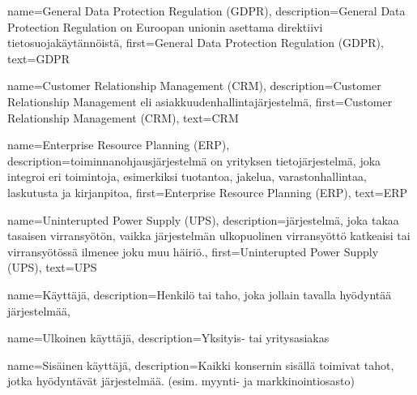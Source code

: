 %
%
%

\makeglossaries



    {
    name={General Data Protection Regulation (GDPR)},
	description={General Data Protection Regulation on Euroopan unionin asettama direktiivi tietosuojakäytännöistä},
	first={General Data Protection Regulation (GDPR)},
	text={GDPR}
    }

    {
	name={Customer Relationship Management (CRM)},
	description={Customer Relationship Management eli asiakkuudenhallintajärjestelmä},
	first={Customer Relationship Management (CRM)},
	text={CRM}
    }

    {
    name={Enterprise Resource Planning (ERP)},
    description={toiminnanohjausjärjestelmä on yrityksen tietojärjestelmä, joka integroi eri toimintoja, esimerkiksi tuotantoa, jakelua, varastonhallintaa, laskutusta ja kirjanpitoa},
    first={Enterprise Resource Planning (ERP)},
    text={ERP}
    }

    {
    name={Uninterupted Power Supply (UPS)},
    description={järjestelmä, joka takaa tasaisen virransyötön, vaikka järjestelmän ulkopuolinen virransyöttö katkeaisi tai virransyötössä ilmenee joku muu häiriö.},
    first={Uninterupted Power Supply (UPS)},
    text={UPS}
    }

    {
    name={Käyttäjä},
    description={Henkilö tai taho, joka jollain tavalla hyödyntää järjestelmää},
    }

    {
    name={Ulkoinen käyttäjä},
    description={Yksityis- tai yritysasiakas}
    }

    {
    name={Sisäinen käyttäjä},
    description={Kaikki konsernin sisällä toimivat tahot, jotka hyödyntävät järjestelmää. (esim. myynti- ja markkinointiosasto)}
    }

